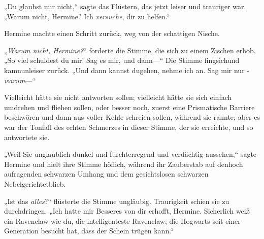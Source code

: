 „Du glaubst mir nicht,“ sagte das Flüstern, das jetzt leiser und trauriger war. „Warum nicht, Hermine? Ich \emph{versuche}, dir zu helfen.“

Hermine machte einen Schritt zurück, weg von der schattigen Nische.

„\emph{Warum nicht, Hermine?}“ forderte die Stimme, die sich zu einem Zischen erhob. „So viel schuldest du mir! Sag es mir, und dann—“ Die Stimme fingsichund kamnunleiser zurück. „Und dann kannst dugehen, nehme ich an. Sag mir nur -\emph{warum}—“

Vielleicht hätte sie nicht antworten sollen; vielleicht hätte sie sich einfach umdrehen und fliehen sollen, oder besser noch, zuerst eine Prismatische Barriere beschwören und dann aus voller Kehle schreien sollen, während sie rannte; aber es war der Tonfall des echten Schmerzes in dieser Stimme, der sie erreichte, und so antwortete sie.

„Weil Sie unglaublich dunkel und furchterregend und verdächtig aussehen,“ sagte Hermine und hielt ihre Stimme höflich, während ihr Zauberstab auf denhoch aufragenden schwarzen Umhang und dem gesichtslosen schwarzen Nebelgerichtetblieb.

„Ist das \emph{alles}?“ flüsterte die Stimme ungläubig. Traurigkeit schien sie zu durchdringen. „Ich hatte mir Besseres von dir erhofft, Hermine. Sicherlich weiß ein Ravenclaw wie du, die intelligenteste Ravenclaw, die Hogwarts seit einer Generation besucht hat, dass der Schein trügen kann.“

